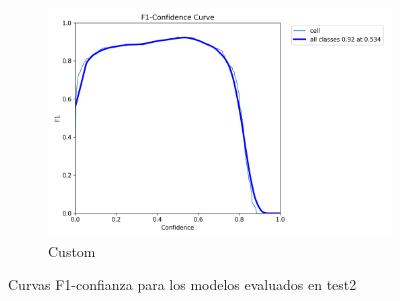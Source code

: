 \documentclass[12pt,a4paper,onecolumn,oneside]{report}
\begin{document}
\begin{figure}[H]
  \vspace{0.5cm}
  \begin{subfigure}[b]{0.48\textwidth}
    \centering
    \includegraphics[width=\textwidth]{figuras/resultados experimentacion/custom/test2/BoxF1_curve.png}
    \caption{Custom}
    \label{fig:custom_test2}
  \end{subfigure}
  
  \caption{Curvas F1-confianza para los modelos evaluados en test2}
  \label{fig:f1_curves_test2}
\end{figure}
\end{document}
